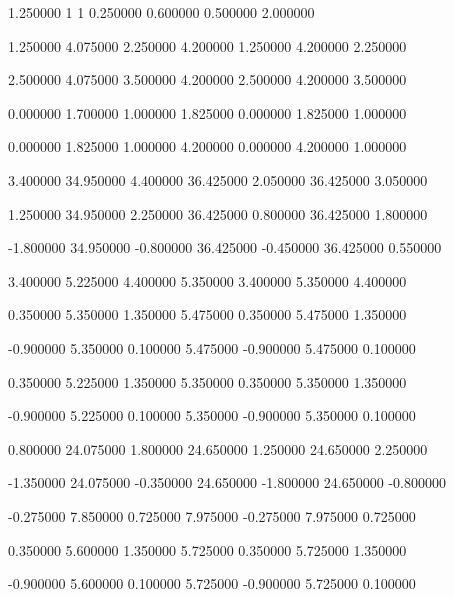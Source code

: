  {1.250000} {1} {1} {0.250000} {0.600000} {0.500000} {2.000000}

 {1.250000} {4.075000} {2.250000} {4.200000} {1.250000} {4.200000} {2.250000}

 {2.500000} {4.075000} {3.500000} {4.200000} {2.500000} {4.200000} {3.500000}

 {0.000000} {1.700000} {1.000000} {1.825000} {0.000000} {1.825000} {1.000000}

 {0.000000} {1.825000} {1.000000} {4.200000} {0.000000} {4.200000} {1.000000}

 {3.400000} {34.950000} {4.400000} {36.425000} {2.050000} {36.425000} {3.050000}

 {1.250000} {34.950000} {2.250000} {36.425000} {0.800000} {36.425000} {1.800000}

 {-1.800000} {34.950000} {-0.800000} {36.425000} {-0.450000} {36.425000} {0.550000}

 {3.400000} {5.225000} {4.400000} {5.350000} {3.400000} {5.350000} {4.400000}

 {0.350000} {5.350000} {1.350000} {5.475000} {0.350000} {5.475000} {1.350000}

 {-0.900000} {5.350000} {0.100000} {5.475000} {-0.900000} {5.475000} {0.100000}

 {0.350000} {5.225000} {1.350000} {5.350000} {0.350000} {5.350000} {1.350000}

 {-0.900000} {5.225000} {0.100000} {5.350000} {-0.900000} {5.350000} {0.100000}

 {0.800000} {24.075000} {1.800000} {24.650000} {1.250000} {24.650000} {2.250000}

 {-1.350000} {24.075000} {-0.350000} {24.650000} {-1.800000} {24.650000} {-0.800000}

 {-0.275000} {7.850000} {0.725000} {7.975000} {-0.275000} {7.975000} {0.725000}

 {0.350000} {5.600000} {1.350000} {5.725000} {0.350000} {5.725000} {1.350000}

 {-0.900000} {5.600000} {0.100000} {5.725000} {-0.900000} {5.725000} {0.100000}

